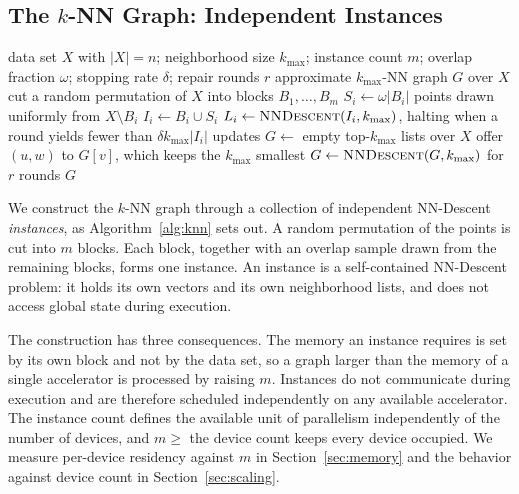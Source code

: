 \documentclass{ieeeaccess}
\newcommand{\kmax}{k_{\max}}
\begin{document}
\subsection{The $k$-NN Graph: Independent Instances}
\label{sec:knn}

\begin{algorithm}[!t]
\caption{The $k$-NN graph, from independent instances}
\label{alg:knn}
\begin{algorithmic}[1]
\REQUIRE data set $X$ with $|X| = n$; neighborhood size $\kmax$; instance count
         $m$; overlap fraction $\omega$; stopping rate $\delta$; repair rounds
         $r$
\ENSURE approximate $\kmax$-NN graph $G$ over $X$
\STATE cut a random permutation of $X$ into blocks $B_1, \dots, B_m$
  \STATE $S_i \gets \omega|B_i|$ points drawn uniformly from $X \setminus B_i$
  \STATE $I_i \gets B_i \cup S_i$
  \STATE $L_i \gets \textsc{NNDescent}(I_i, \kmax)$, halting when a round
         yields fewer than $\delta\kmax|I_i|$ updates
\ENDFOR
\STATE $G \gets$ empty top-$\kmax$ lists over $X$
    \STATE offer $(u, w)$ to $G[v]$, which keeps the $\kmax$ smallest
  \ENDFOR
\ENDFOR
{}
  \STATE $G \gets \textsc{NNDescent}(G, \kmax)$ for $r$ rounds
\ENDIF
\RETURN $G$
\end{algorithmic}
\end{algorithm}

We construct the $k$-NN graph through a collection of independent NN-Descent
\emph{instances}, as Algorithm~\ref{alg:knn} sets out. A random permutation of the points is cut into $m$ blocks.
Each block, together with an overlap sample drawn from the remaining blocks,
forms one instance. An instance is a self-contained NN-Descent problem: it
holds its own vectors and its own neighborhood lists, and does not access
global state during execution.

The construction has three consequences. The memory an instance requires is set
by its own block and not by the data set, so a graph larger than the memory of a
single accelerator is processed by raising $m$.
Instances do not communicate during execution and are therefore scheduled
independently on any available accelerator. The instance count defines the
available unit of parallelism independently of the number of devices, and
$m \ge$ the device count keeps every device occupied. We measure per-device
residency against $m$ in Section~\ref{sec:memory} and the behavior against
device count in Section~\ref{sec:scaling}.
\end{document}
